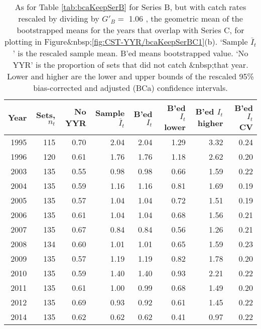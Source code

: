 \begin{table}[tp]
\centering
\caption{As for Table \ref{tab:bcaKeepSerB} for Series B, 
     but with catch rates rescaled by dividing
     by $G'_{B}=$ 1.06 , 
     the geometric mean of the bootstrapped means for the years that overlap
     with Series C, for plotting in Figure&nbsp;\ref{fig:CST-YYR/bcaKeepSerBC1}(b).
     `Sample $\bar{I}_t$' is the rescaled sample mean. B'ed means bootstrapped 
     value. `No YYR' is the proportion of sets that did not catch \spName&nbsp;that
     year. Lower and higher are the 
     lower and upper bounds of the rescaled 
     95\% bias-corrected and adjusted (BCa)
     confidence intervals.} 
\label{tab:serBscaled}
\begin{tabular}{rrrrrrrr}
  \hline
Year & Sets, $n_t$ & No YYR & Sample $\bar{I}_t$ & B'ed $I_t$ & B'ed $I_t$ lower & B'ed $I_t$ higher & B'ed $I_t$ CV \\ 
  \hline
1995 & 115 & 0.70 & 2.04 & 2.04 & 1.29 & 3.32 & 0.24 \\ 
  1996 & 120 & 0.61 & 1.76 & 1.76 & 1.18 & 2.62 & 0.20 \\ 
  2003 & 135 & 0.55 & 0.98 & 0.98 & 0.66 & 1.59 & 0.22 \\ 
  2004 & 135 & 0.59 & 1.16 & 1.16 & 0.81 & 1.69 & 0.19 \\ 
  2005 & 135 & 0.57 & 1.04 & 1.04 & 0.72 & 1.51 & 0.19 \\ 
  2006 & 135 & 0.61 & 1.04 & 1.04 & 0.68 & 1.56 & 0.21 \\ 
  2007 & 135 & 0.67 & 0.84 & 0.84 & 0.56 & 1.26 & 0.21 \\ 
  2008 & 134 & 0.60 & 1.01 & 1.01 & 0.65 & 1.59 & 0.23 \\ 
  2009 & 135 & 0.57 & 1.19 & 1.19 & 0.82 & 1.78 & 0.20 \\ 
  2010 & 135 & 0.59 & 1.40 & 1.40 & 0.93 & 2.21 & 0.22 \\ 
  2011 & 135 & 0.61 & 1.00 & 0.99 & 0.68 & 1.49 & 0.20 \\ 
  2012 & 135 & 0.69 & 0.93 & 0.92 & 0.61 & 1.45 & 0.22 \\ 
  2014 & 135 & 0.62 & 0.62 & 0.62 & 0.41 & 0.97 & 0.22 \\ 
   \hline
\end{tabular}
\end{table}%
